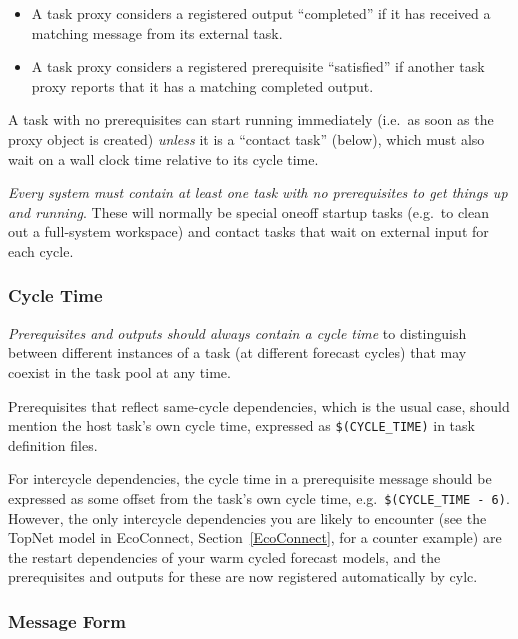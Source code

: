 \documentclass[11pt,a4paper]{article}
\begin{document}
\begin{itemize}
    \item A task proxy considers a registered output ``completed''
        if it has received a matching message from its external task.

    \item A task proxy considers a registered prerequisite ``satisfied''
        if another task proxy reports that it has a matching completed
        output.

\end{itemize}

A task with no prerequisites can start running immediately (i.e.\ as soon
as the proxy object is created) {\em unless} it is a ``contact task''
(below), which must also wait on a wall clock time relative to its cycle time.

{\em Every system must contain at least one task with no prerequisites
to get things up and running}. These will normally be special oneoff
startup tasks (e.g.\ to clean out a full-system workspace) and contact
tasks that wait on external input for each cycle.


\lstset{language=cylctaskdef} 

\subsubsection{Cycle Time}

{\em Prerequisites and outputs should always contain a cycle time} to
distinguish between different instances of a task (at different 
forecast cycles) that may coexist in the task pool at any time. 

Prerequisites that reflect same-cycle dependencies, which is the usual
case, should mention the host task's own cycle time, expressed as
\lstinline=$(CYCLE_TIME)= in task definition files.

For intercycle dependencies, the cycle time in a prerequisite message
should be expressed as some offset from the task's own cycle time, e.g.\
\lstinline=$(CYCLE_TIME - 6)=. However, the only intercycle dependencies
you are likely to encounter (see the TopNet model in EcoConnect,
Section~\ref{EcoConnect}, for a counter example) are the restart
dependencies of your warm cycled forecast models, and the prerequisites
and outputs for these are now registered automatically by cylc.

\subsubsection{Message Form}
\end{document}

